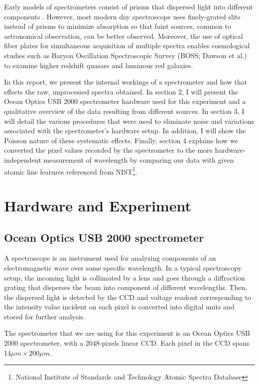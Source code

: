 \documentclass[authoryear, 12pt,5p, times]{elsarticle}
\begin{document}
Early models of spectrometers consist of prisms that dispersed light into different components . However, most modern day spectroscope uses finely-grated slits instead of prisms to minimize absorption so that faint sources, common to astronomical observation, can be better observed. Moreover, the use of optical fiber plates for simultaneous acquisition of multiple spectra enables cosmological studies such as Baryon Oscillation Spectroscopic Survey (BOSS; Dawson et al.) to examine higher redshift quasars and luminous red galaxies.

In this report, we present the internal workings of a spectrometer and how that effects the raw, unprocessed spectra obtained. In section 2, I will present the Ocean Optics USB 2000 spectrometer hardware used for this experiment and a qualitative overview of the data resulting from different sources. In section 3, I will detail the various procedures that were used to eliminate noise and variations associated with the spectrometer's hardware setup.  In addition, I will show the Poisson nature of these systematic effects. Finally, section 4 explains how we converted the pixel values recorded by the spectrometer to the more hardware-independent measurement of wavelength by comparing our data with given atomic line features referenced from NIST\footnote{National Institute of Standards and Technology Atomic Spectra Database}.
\section{Hardware and Experiment}
	\subsection{Ocean Optics USB 2000 spectrometer}
	A spectroscope is an instrument used for analyzing components of an electromagnetic wave over some specific wavelength. In a typical spectroscopy setup, the incoming light is collimated by a lens and goes through a diffraction grating that disperses the beam into component of different wavelengths.  Then, the dispersed light is detected by the CCD and %
voltage readout corresponding to the intensity value incident on each pixel is converted into digital units and stored for further analysis.  %

The spectrometer that we are using for this experiment is an Ocean Optics USB 2000 spectrometer, with a 2048-pixels linear CCD. Each pixel in the CCD spans 14$\mu m\times 200\mu m$.
\end{document}

